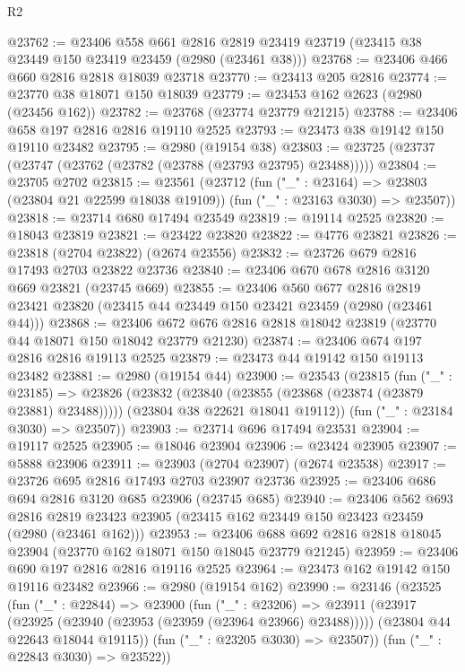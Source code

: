 \begin{lexlean}{R2}
\begin{coremodule}
@23762 := @23406
    @558
    @661
    @2816
    @2819
    @23419
    @23719
    (@23415 @38 @23449 @150 @23419 @23459 (@2980 (@23461 @38)))
@23768 := @23406 @466 @660 @2816 @2818 @18039 @23718
@23770 := @23413 @205 @2816
@23774 := @23770 @38 @18071 @150 @18039
@23779 := @23453 @162 @2623 (@2980 (@23456 @162))
@23782 := @23768 (@23774 @23779 @21215)
@23788 := @23406 @658 @197 @2816 @2816 @19110 @2525
@23793 := @23473 @38 @19142 @150 @19110 @23482
@23795 := @2980 (@19154 @38)
@23803 := @23725 (@23737 (@23747 (@23762 (@23782 (@23788 (@23793 @23795) @23488)))))
@23804 := @23705 @2702
@23815 := @23561
    (@23712
      (fun ("_" : @23164) => @23803 (@23804 @21 @22599 @18038 @19109))
      (fun ("_" : @23163 @3030) => @23507))
@23818 := @23714 @680 @17494 @23549
@23819 := @19114 @2525
@23820 := @18043 @23819
@23821 := @23422 @23820
@23822 := @4776 @23821
@23826 := @23818 (@2704 @23822) (@2674 @23556)
@23832 := @23726 @679 @2816 @17493 @2703 @23822 @23736
@23840 := @23406 @670 @678 @2816 @3120 @669 @23821 (@23745 @669)
@23855 := @23406
    @560
    @677
    @2816
    @2819
    @23421
    @23820
    (@23415 @44 @23449 @150 @23421 @23459 (@2980 (@23461 @44)))
@23868 := @23406 @672 @676 @2816 @2818 @18042 @23819 (@23770 @44 @18071 @150 @18042 @23779 @21230)
@23874 := @23406 @674 @197 @2816 @2816 @19113 @2525
@23879 := @23473 @44 @19142 @150 @19113 @23482
@23881 := @2980 (@19154 @44)
@23900 := @23543
    (@23815
      (fun ("_" : @23185) =>
      @23826
        (@23832 (@23840 (@23855 (@23868 (@23874 (@23879 @23881) @23488)))))
        (@23804 @38 @22621 @18041 @19112))
      (fun ("_" : @23184 @3030) => @23507))
@23903 := @23714 @696 @17494 @23531
@23904 := @19117 @2525
@23905 := @18046 @23904
@23906 := @23424 @23905
@23907 := @5888 @23906
@23911 := @23903 (@2704 @23907) (@2674 @23538)
@23917 := @23726 @695 @2816 @17493 @2703 @23907 @23736
@23925 := @23406 @686 @694 @2816 @3120 @685 @23906 (@23745 @685)
@23940 := @23406
    @562
    @693
    @2816
    @2819
    @23423
    @23905
    (@23415 @162 @23449 @150 @23423 @23459 (@2980 (@23461 @162)))
@23953 := @23406 @688 @692 @2816 @2818 @18045 @23904 (@23770 @162 @18071 @150 @18045 @23779 @21245)
@23959 := @23406 @690 @197 @2816 @2816 @19116 @2525
@23964 := @23473 @162 @19142 @150 @19116 @23482
@23966 := @2980 (@19154 @162)
@23990 := @23146
    (@23525
      (fun ("_" : @22844) =>
      @23900
        (fun ("_" : @23206) =>
        @23911
          (@23917 (@23925 (@23940 (@23953 (@23959 (@23964 @23966) @23488)))))
          (@23804 @44 @22643 @18044 @19115))
        (fun ("_" : @23205 @3030) => @23507))
      (fun ("_" : @22843 @3030) => @23522))

\end{coremodule}
\end{lexlean}
